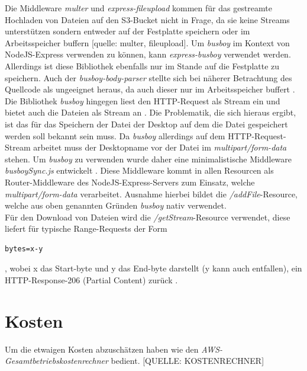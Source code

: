 \documentclass[a4paper, 12pt]{scrreprt}
\renewcommand\_{\textunderscore\allowbreak}
\begin{document}
\noindent Die Middleware \textit{multer} und \textit{express-fileupload} kommen für das gestreamte Hochladen von Dateien auf den S3-Bucket nicht in Frage, da sie keine Streams unterstützen sondern entweder auf der Festplatte speichern  oder im Arbeitsspeicher buffern [quelle: multer, fileupload].
Um \textit{busboy} im Kontext von NodeJS-Express verwenden zu können, kann \textit{express-busboy} verwendet werden. Allerdings ist diese Bibliothek ebenfalls nur im Stande auf die Festplatte zu speichern. Auch der \textit{busboy-body-parser} stellte sich bei näherer Betrachtung des Quellcode als ungeeignet heraus, da auch dieser nur im Arbeitsspeicher buffert \cite{LeonardMartin}.\\
Die Bibliothek \textit{busboy} hingegen liest den HTTP-Request als Stream ein und bietet auch die Dateien als Stream an \cite{busboy}.
Die Problematik, die sich hieraus ergibt, ist das für das Speichern der Datei der Desktop auf dem die Datei gespeichert werden soll bekannt sein muss. Da \textit{busboy} allerdings auf dem HTTP-Request-Stream arbeitet muss der Desktopname vor der Datei im \textit{multipart/form-data} stehen. Um \textit{busboy} zu verwenden wurde daher eine minimalistische Middleware \textit{busboySync.js} entwickelt \cite{Express}.
Diese Middleware kommt in allen Resourcen als Router-Middleware des NodeJS-Express-Servers zum Einsatz, welche \textit{multipart/form-data} verarbeitet. Ausnahme hierbei bildet die \textit{/addFile}-Resource, welche aus oben genannten Gründen \textit{busboy} nativ verwendet.\\
Für den Download von Dateien wird die \textit{/getStream}-Resource verwendet, diese liefert für typische Range-Requests der Form
\begin{lstlisting}
bytes=x-y
\end{lstlisting}
, wobei x das Start-byte und y das End-byte darstellt (y kann auch entfallen), ein HTTP-Response-206 (Partial Content) zurück \cite{HTP}.


\chapter{Kosten}
Um die etwaigen Kosten abzuschätzen haben wie den \textit{AWS-Gesamtbetriebskostenrechner} bedient. [QUELLE: KOSTENRECHNER] 
\end{document}

